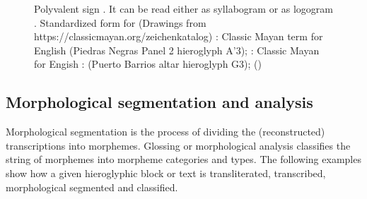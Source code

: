 \documentclass[../main.tex]{subfiles}
\begin{document}
\begin{figure}[ht]
{    }
    \caption[Polyvalent sign ]{Polyvalent sign .
            It can be read either as syllabogram  or as logogram .
            Standardized form for 
            (Drawings from https://classicmayan.org/zeichenkatalog)
            :
            Classic Mayan term  for English 
            (Piedras Negras Panel 2 hieroglyph A'3);
            :
            Classic Mayan  for 
            Engish : 
            (Puerto Barrios altar hieroglyph G3); (\authordrawings)}
\end{figure}

\subsection{Morphological segmentation and analysis}
Morphological segmentation is the process of dividing the (reconstructed) transcriptions into
morphemes.
Glossing or morphological analysis classifies the string of morphemes into morpheme categories 
and types.
The following examples show how a given hieroglyphic block or text is transliterated, transcribed,
morphological segmented and classified.
\end{document}
